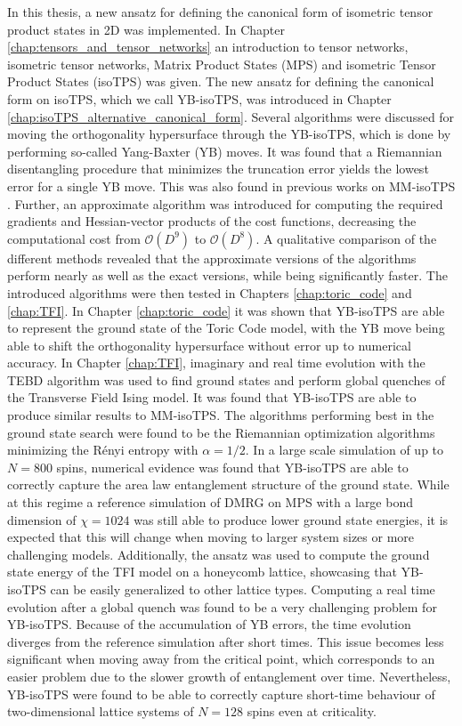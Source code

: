 In this thesis, a new ansatz for defining the canonical form of isometric tensor product states in 2D was implemented. In Chapter \ref{chap:tensors_and_tensor_networks} an introduction to tensor networks, isometric tensor networks, Matrix Product States (MPS) and isometric Tensor Product States (isoTPS) was given. The new ansatz for defining the canonical form on isoTPS, which we call YB-isoTPS, was introduced in Chapter \ref{chap:isoTPS_alternative_canonical_form}. Several algorithms were discussed for moving the orthogonality hypersurface through the YB-isoTPS, which is done by performing so-called Yang-Baxter (YB) moves. It was found that a Riemannian disentangling procedure that minimizes the truncation error yields the lowest error for a single YB move. This was also found in previous works on MM-isoTPS \cite{cite:isometric_tensor_network_states_in_two_dimensions, cite:efficient_simulation_of_dynamics_in_two_dimensional_quantum_spin_systems}. Further, an approximate algorithm was introduced for computing the required gradients and Hessian-vector products of the cost functions, decreasing the computational cost from $\mathcal{O}(D^9)$ to $\mathcal{O}(D^8)$. A qualitative comparison of the different methods revealed that the approximate versions of the algorithms perform nearly as well as the exact versions, while being significantly faster. The introduced algorithms were then tested in Chapters \ref{chap:toric_code} and \ref{chap:TFI}. In Chapter \ref{chap:toric_code} it was shown that YB-isoTPS are able to represent the ground state of the Toric Code model, with the YB move being able to shift the orthogonality hypersurface without error up to numerical accuracy. In Chapter \ref{chap:TFI}, imaginary and real time evolution with the TEBD algorithm was used to find ground states and perform global quenches of the Transverse Field Ising model. It was found that YB-isoTPS are able to produce similar results to MM-isoTPS. The algorithms performing best in the ground state search were found to be the Riemannian optimization algorithms minimizing the Rényi entropy with $\alpha = 1/2$. In a large scale simulation of up to $N = 800$ spins, numerical evidence was found that YB-isoTPS are able to correctly capture the area law entanglement structure of the ground state. While at this regime a reference simulation of DMRG on MPS with a large bond dimension of $\chi = 1024$ was still able to produce lower ground state energies, it is expected that this will change when moving to larger system sizes or more challenging models. Additionally, the ansatz was used to compute the ground state energy of the TFI model on a honeycomb lattice, showcasing that YB-isoTPS can be easily generalized to other lattice types. Computing a real time evolution after a global quench was found to be a very challenging problem for YB-isoTPS. Because of the accumulation of YB errors, the time evolution diverges from the reference simulation after short times. This issue becomes less significant when moving away from the critical point, which corresponds to an easier problem due to the slower growth of entanglement over time. Nevertheless, YB-isoTPS were found to be able to correctly capture short-time behaviour of two-dimensional lattice systems of $N = 128$ spins even at criticality. \par

